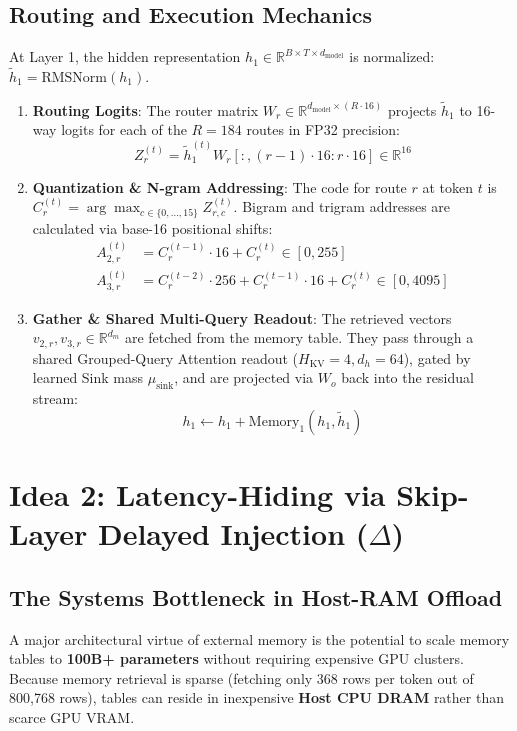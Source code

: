 \documentclass[11pt,a4paper]{article}
\begin{document}
\subsection{Routing and Execution Mechanics}
At Layer 1, the hidden representation $h_1 \in \mathbb{R}^{B \times T \times d_{\text{model}}}$ is normalized: $\tilde{h}_1 = \text{RMSNorm}(h_1)$.
\begin{enumerate}[leftmargin=1.4em, itemsep=2pt]
    \item \textbf{Routing Logits}: The router matrix $W_r \in \mathbb{R}^{d_{\text{model}} \times (R \cdot 16)}$ projects $\tilde{h}_1$ to 16-way logits for each of the $R = 184$ routes in FP32 precision:
    \begin{equation}
    Z_r^{(t)} = \tilde{h}_1^{(t)} W_r[:, (r-1)\cdot 16 : r\cdot 16] \in \mathbb{R}^{16}
    \end{equation}
    \item \textbf{Quantization \& N-gram Addressing}: The code for route $r$ at token $t$ is $C_r^{(t)} = \arg\max_{c \in \{0, \dots, 15\}} Z_{r, c}^{(t)}$. Bigram and trigram addresses are calculated via base-16 positional shifts:
    \begin{align}
    A_{2, r}^{(t)} &= C_r^{(t-1)} \cdot 16 + C_r^{(t)} \in [0, 255] \\
    A_{3, r}^{(t)} &= C_r^{(t-2)} \cdot 256 + C_r^{(t-1)} \cdot 16 + C_r^{(t)} \in [0, 4095]
    \end{align}
    \item \textbf{Gather \& Shared Multi-Query Readout}: The retrieved vectors $v_{2, r}, v_{3, r} \in \mathbb{R}^{d_m}$ are fetched from the memory table. They pass through a shared Grouped-Query Attention readout ($H_{\text{KV}} = 4, d_h = 64$), gated by learned Sink mass $\mu_{\text{sink}}$, and are projected via $W_o$ back into the residual stream:
    \begin{equation}
    h_1 \leftarrow h_1 + \text{Memory}_1(h_1, \tilde{h}_1)
    \end{equation}
\end{enumerate}

\vspace{0.5em}

\section{Idea 2: Latency-Hiding via Skip-Layer Delayed Injection (\texorpdfstring{$\Delta$}{Delta})}
\label{sec:idea2}

\subsection{The Systems Bottleneck in Host-RAM Offload}
A major architectural virtue of external memory is the potential to scale memory tables to \textbf{100B+ parameters} without requiring expensive GPU clusters. Because memory retrieval is sparse (fetching only 368 rows per token out of 800,768 rows), tables can reside in inexpensive \textbf{Host CPU DRAM} rather than scarce GPU VRAM.
\end{document}
